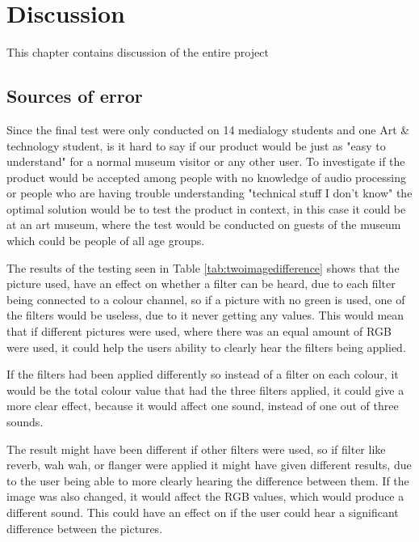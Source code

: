 \chapter{Discussion}\label{ch:discussion}
This chapter contains discussion of the entire project 

\section{Sources of error}

 Since the final test were only conducted on 14 medialogy students and one Art \& technology student, is it hard to say if our product would be just as "easy to understand" for a normal museum visitor or any other user. To investigate if the product would be accepted among people with no knowledge of audio processing or people who are having trouble understanding "technical stuff I don't know" the optimal solution would be to test the product in context, in this case it could be at an art museum, where the test would be conducted on guests of the museum which could be people of all age groups. 
 
  The results of the testing seen in Table \ref{tab:twoimagedifference} shows that the picture used, have an effect on whether a filter can be heard, due to each filter being connected to a colour channel, so if a picture with no green is used, one of the filters would be useless, due to it never getting any values. This would mean that if different pictures were used, where there was an equal amount of RGB were used, it could help the users ability to clearly hear the filters being applied. 
   
 If the filters had been applied differently so instead of a filter on each colour, it would be the total colour value that had the three filters applied, it could give a more clear effect, because it would affect one sound, instead of one out of three sounds. 
 
 The result might have been different if other filters were used, so if filter like reverb, wah wah, or flanger were applied it might have given different results, due to the user being able to more clearly hearing the difference between them. If the image was also changed, it would affect the RGB values, which would produce a different sound. This could have an effect on if the user could hear a significant difference between the pictures.

